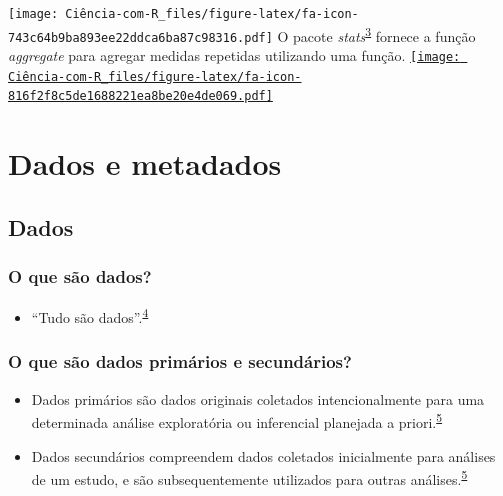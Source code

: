 \documentclass[
]{book}
\providecommand{\tightlist}{%
  \setlength{\itemsep}{0pt}\setlength{\parskip}{0pt}}
\begin{document}
\texttt{[image: Ciência-com-R\_files/figure-latex/fa-icon-743c64b9ba893ee22ddca6ba87c98316.pdf]} O pacote \emph{stats}\textsuperscript{\protect\hyperlink{ref-stats-2}{3}} fornece a função \emph{aggregate} para agregar medidas repetidas utilizando uma função. \href{https://rdocumentation.org/packages/stats/versions/3.6.2}{\texttt{[image: Ciência-com-R\_files/figure-latex/fa-icon-816f2f8c5de1688221ea8be20e4de069.pdf]}}

\hypertarget{dados-metadados}{%
\chapter{\texorpdfstring{\textbf{Dados e metadados}}{Dados e metadados}}\label{dados-metadados}}

\hypertarget{dados}{%
\section{Dados}\label{dados}}

\hypertarget{o-que-suxe3o-dados}{%
\subsection{O que são dados?}\label{o-que-suxe3o-dados}}

\begin{itemize}
\tightlist
\item
  ``Tudo são dados''.\textsuperscript{\protect\hyperlink{ref-Olson2021}{4}}
\end{itemize}

\hypertarget{o-que-suxe3o-dados-primuxe1rios-e-secunduxe1rios}{%
\subsection{O que são dados primários e secundários?}\label{o-que-suxe3o-dados-primuxe1rios-e-secunduxe1rios}}

\begin{itemize}
\item
  Dados primários são dados originais coletados intencionalmente para uma determinada análise exploratória ou inferencial planejada a priori.\textsuperscript{\protect\hyperlink{ref-vetter2017}{5}}
\item
  Dados secundários compreendem dados coletados inicialmente para análises de um estudo, e são subsequentemente utilizados para outras análises.\textsuperscript{\protect\hyperlink{ref-vetter2017}{5}}
\end{itemize}
\end{document}
